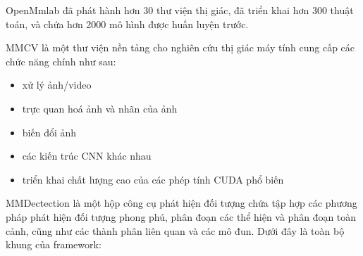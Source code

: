 \documentclass[12pt,a4paper,openany,oneside]{report}
\begin{document}
OpenMmlab đã phát hành hơn 30 thư viện thị giác, đã triển khai hơn 300 thuật toán, và chứa hơn 2000 mô hình được huấn luyện trước.

MMCV là một thư viện nền tảng cho nghiên cứu thị giác máy tính cung cấp các chức năng chính như sau:
\begin{itemize}
	\item xử lý ảnh/video
	\item trực quan hoá ảnh và nhãn của ảnh
	\item biến đổi ảnh
	\item các kiến trúc CNN khác nhau
	\item triển khai chất lượng cao của các phép tính CUDA phổ biến
\end{itemize}

MMDectection là một hộp công cụ phát hiện đối tượng chứa tập hợp các phương pháp phát hiện đối tượng phong phú, phân đoạn các thể hiện và phân đoạn toàn cảnh, cũng như  các thành phân liên quan và các mô đun. Dưới đây là toàn bộ khung của framework:
\end{document}
